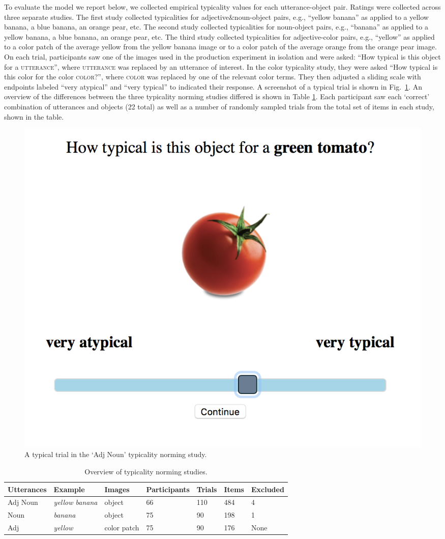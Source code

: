 \documentclass[10pt,letterpaper]{article}
\newcommand{\tableref}[1]{Table \ref{#1}}
\newcommand{\figref}[1]{Fig.~\ref{#1}}
\begin{document}
To evaluate the model we report below, we collected empirical typicality values for each utterance-object pair. Ratings were collected across three separate studies. The first study collected typicalities for adjective\&noun-object pairs, e.g., ``yellow banana'' as applied to a yellow banana, a blue banana, an orange pear, etc. The second study collected typicalities for noun-object pairs, e.g., ``banana'' as applied to a yellow banana, a blue banana, an orange pear, etc. The third study collected typicalities for adjective-color pairs, e.g., ``yellow'' as applied to a color patch of the average yellow from the yellow banana image or to a color patch of the average orange from the orange pear image.  On each trial, participants saw one of the images used in the production experiment in isolation and were asked: ``How typical is this object for a \textsc{utterance}'', where \textsc{utterance} was replaced by an utterance of interest. In the color typicality study, they were asked ``How typical is this color for the color \textsc{color}?'', where \textsc{color} was replaced by one of the relevant color terms.  They then adjusted a sliding scale with endpoints labeled ``very atypical'' and ``very typical'' to indicated their response. A screenshot of a typical trial is shown in \figref{fig:typicalitynorming}. An overview of the differences between the three typicality norming studies differed is shown in \tableref{tab:normingoverview}. Each participant saw each `correct' combination of utterances and objects (22 total) as well as a number of randomly sampled trials from the total set of items in each study, shown in the table.

\begin{figure}[bt!]
	\centering
	\includegraphics[width=.5\textwidth]{graphs/typ_norm_full_2}
	\caption{A typical trial in the `Adj Noun' typicality norming study.
	}
	\label{fig:typicalitynorming}
\end{figure}


\begin{table}
\caption{Overview of typicality norming studies.}
\begin{tabular}{l l l l l l l}
\toprule
Utterances & Example & Images & Participants & Trials & Items & Excluded\\
\midrule
Adj Noun & \emph{yellow banana} & object & 66 & 110 & 484 & 4\\ 
Noun & \emph{banana} & object & 75 & 90 & 198 & 1\\
Adj & \emph{yellow} & color patch & 75 & 90 & 176 & None\\
\bottomrule
\end{tabular}
\label{tab:normingoverview}
\end{table}
\end{document}
